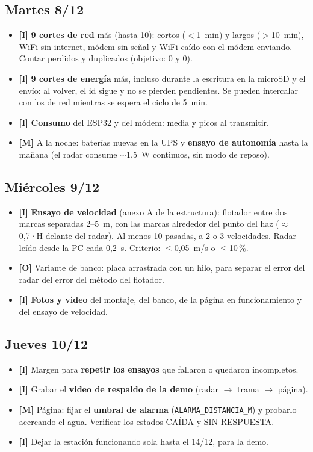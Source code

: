\documentclass[11pt,a4paper]{article}
\newcommand{\imp}{\textcolor{rojo}{\textbf{[I]}}}
\newcommand{\mej}{\textcolor{ambar}{\textbf{[M]}}}
\newcommand{\opc}{\textcolor{gris}{\textbf{[O]}}}
\begin{document}
\subsection{Martes 8/12}
\begin{itemize}
  \item \imp{} \textbf{9 cortes de red} más (hasta 10): cortos ($<$1~min) y largos ($>$10~min),
        WiFi sin internet, módem sin señal y WiFi caído con el módem enviando. Contar
        perdidos y duplicados (objetivo: 0 y 0).
  \item \imp{} \textbf{9 cortes de energía} más, incluso durante la escritura en la microSD y el envío:
        al volver, el id sigue y no se pierden pendientes. Se pueden intercalar con los de red
        mientras se espera el ciclo de 5~min.
  \item \imp{} \textbf{Consumo} del ESP32 y del módem: media y picos al transmitir.
  \item \mej{} A la noche: baterías nuevas en la UPS y \textbf{ensayo de autonomía} hasta la mañana
        (el radar consume $\sim$1,5~W continuos, sin modo de reposo).
\end{itemize}

\subsection{Miércoles 9/12}
\begin{itemize}
  \item \imp{} \textbf{Ensayo de velocidad} (anexo A de la estructura): flotador entre dos marcas
        separadas 2--5~m, con las marcas alrededor del punto del haz ($\approx$0,7·H delante del
        radar). Al menos 10 pasadas, a 2 o 3 velocidades. Radar leído desde la PC cada 0,2~s.
        Criterio: $\leq$0,05~m/s o $\leq$10\,\%.
  \item \opc{} Variante de banco: placa arrastrada con un hilo, para separar el error del radar del
        error del método del flotador.
  \item \imp{} \textbf{Fotos y video} del montaje, del banco, de la página en funcionamiento y del
        ensayo de velocidad.
\end{itemize}

\subsection{Jueves 10/12}
\begin{itemize}
  \item \imp{} Margen para \textbf{repetir los ensayos} que fallaron o quedaron incompletos.
  \item \imp{} Grabar el \textbf{video de respaldo de la demo} (radar $\to$ trama $\to$ página).
  \item \mej{} Página: fijar el \textbf{umbral de alarma} (\texttt{ALARMA\_DISTANCIA\_M}) y
        probarlo acercando el agua. Verificar los estados CAÍDA y SIN RESPUESTA.
  \item \imp{} Dejar la estación funcionando sola hasta el 14/12, para la demo.
\end{itemize}
\end{document}
